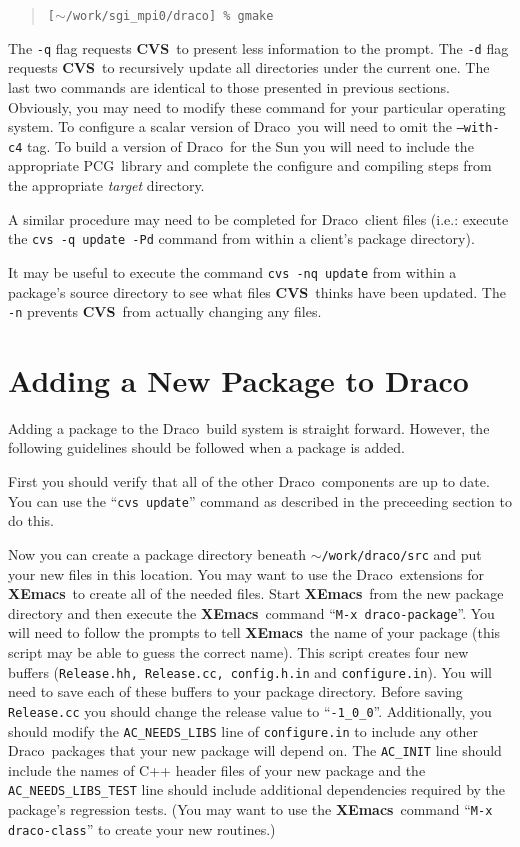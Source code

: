 \documentclass[11pt]{nmemo}
\newcommand{\comp}[1]{\normalfont\footnotesize\texttt{#1}\normalsize}
\newcommand{\draco}{{\normalfont\sffamily Draco}}
\newcommand{\pcg}{{\normalfont\sffamily PCG}}
\newcommand{\cvs}{{\normalfont\bfseries CVS}}
\newcommand{\xemacs}{{\normalfont\bfseries XEmacs}}
\begin{document}
\begin{verse}
\texttt{[$\sim$/work/sgi\_mpi0/draco] \% gmake}
\end{verse}
\normalsize

The \comp{-q} flag requests \cvs\ to present less information to the
prompt.  The \comp{-d} flag requests \cvs\ to recursively update all
directories under the current one.  The last two commands are
identical to those presented in previous sections.  Obviously, you may
need to modify these command for your particular operating system.  To
configure a scalar version of \draco\ you will need to omit the
\comp{--with-c4} tag.  To build a version of \draco\ for the Sun you
will need to include the appropriate \pcg\ library and complete the
configure and compiling steps from the appropriate \emph{target}
directory.

A similar procedure may need to be completed for \draco\ client files
(i.e.: execute the \comp{cvs -q update -Pd} command from within a
client's package directory).

It may be useful to execute the command \comp{cvs -nq update} from
within a package's source directory to see what files \cvs\ thinks
have been updated.  The \comp{-n} prevents \cvs\ from actually
changing any files.


\section{Adding a New Package to Draco}

Adding a package to the \draco\ build system is straight forward.
However, the following guidelines should be followed when a package is
added.

First you should verify that all of the other \draco\ components are
up to date.  You can use the ``\comp{cvs update}'' command as described in
the preceeding section to do this.  

Now you can create a package directory beneath
\comp{$\sim$/work/draco/src} and put your new files in this location.
You may want to use the \draco\ extensions for \xemacs\ to create all
of the needed files.  Start \xemacs\ from the new package directory
and then execute the \xemacs\ command ``\comp{M-x draco-package}''.
You will need to follow the prompts to tell \xemacs\ the name of your
package (this script may be able to guess the correct name).  This
script creates four new buffers (\comp{Release.hh, Release.cc,
  config.h.in} and \comp{configure.in}).  You will need to save each
of these buffers to your package directory.  Before saving
\comp{Release.cc} you should change the release value to
``\comp{-1\_0\_0}''.  Additionally, you should modify the
\comp{AC\_NEEDS\_LIBS} line of \comp{configure.in} to include any
other \draco\ packages that your new package will depend on.  The
\comp{AC\_INIT} line should include the names of C++ header files of
your new package and the \comp{AC\_NEEDS\_LIBS\_TEST} line should
include additional dependencies required by the package's regression
tests.  (You may want to use the \xemacs\ command ``\comp{M-x
  draco-class}'' to create your new routines.)
\end{document}
